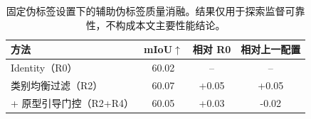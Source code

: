 \begin{table}[t]
  \centering
  \small
  \setlength{\tabcolsep}{4pt}
  \renewcommand{\arraystretch}{1.08}
  \caption{固定伪标签设置下的辅助伪标签质量消融。结果仅用于探索监督可靠性，不构成本文主要性能结论。}
  \label{tab:pseudo_label_ablation}
  \begin{tabular}{lccc}
    \toprule
    方法 & mIoU$\uparrow$ & 相对 R0 & 相对上一配置 \\
    \midrule
    Identity（R0） & 60.02 & -- & -- \\
    类别均衡过滤（R2） & 60.07 & +0.05 & +0.05 \\
    + 原型引导门控（R2+R4） & 60.05 & +0.03 & -0.02 \\
    \bottomrule
  \end{tabular}
\end{table}
